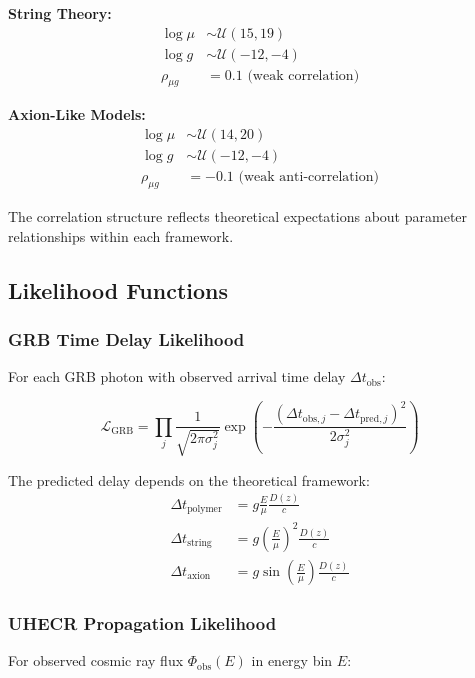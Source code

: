 \documentclass[12pt]{article}
\begin{document}
\textbf{String Theory:}
\begin{align}
\log \mu &\sim \mathcal{U}(15, 19) \\
\log g &\sim \mathcal{U}(-12, -4) \\
\rho_{\mu g} &= 0.1 \text{ (weak correlation)}
\end{align}

\textbf{Axion-Like Models:}
\begin{align}
\log \mu &\sim \mathcal{U}(14, 20) \\
\log g &\sim \mathcal{U}(-12, -4) \\
\rho_{\mu g} &= -0.1 \text{ (weak anti-correlation)}
\end{align}

The correlation structure reflects theoretical expectations about parameter relationships within each framework.

\subsection{Likelihood Functions}

\subsubsection{GRB Time Delay Likelihood}

For each GRB photon with observed arrival time delay $\Delta t_{\text{obs}}$:

\begin{equation}
\mathcal{L}_{\text{GRB}} = \prod_{j} \frac{1}{\sqrt{2\pi\sigma_j^2}} \exp\left(-\frac{(\Delta t_{\text{obs},j} - \Delta t_{\text{pred},j})^2}{2\sigma_j^2}\right)
\end{equation}

The predicted delay depends on the theoretical framework:
\begin{align}
\Delta t_{\text{polymer}} &= g \frac{E}{\mu} \frac{D(z)}{c} \\
\Delta t_{\text{string}} &= g \left(\frac{E}{\mu}\right)^2 \frac{D(z)}{c} \\
\Delta t_{\text{axion}} &= g \sin\left(\frac{E}{\mu}\right) \frac{D(z)}{c}
\end{align}

\subsubsection{UHECR Propagation Likelihood}

For observed cosmic ray flux $\Phi_{\text{obs}}(E)$ in energy bin $E$:
\end{document}
